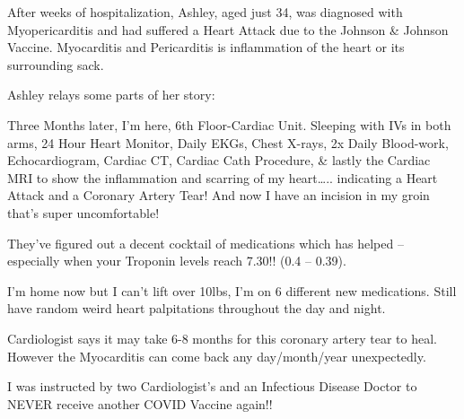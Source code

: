 After weeks of hospitalization, Ashley, aged just 34, was diagnosed with
Myopericarditis and had suffered a Heart Attack due to the Johnson \& Johnson
Vaccine. Myocarditis and Pericarditis is inflammation of the heart or its
surrounding sack.

Ashley relays some parts of her story:

Three Months later, I’m here, 6th Floor-Cardiac Unit. Sleeping with IVs in both
arms, 24 Hour Heart Monitor, Daily EKGs, Chest X-rays, 2x Daily Blood-work,
Echocardiogram, Cardiac CT, Cardiac Cath Procedure, \& lastly the Cardiac MRI to
show the inflammation and scarring of my heart….. indicating a Heart Attack and
a Coronary Artery Tear! And now I have an incision in my groin that’s super
uncomfortable!

They’ve figured out a decent cocktail of medications which has helped –
especially when your Troponin levels reach 7.30!! (0.4 – 0.39).

I’m home now but I can’t lift over 10lbs, I’m on 6 different new
medications. Still have random weird heart palpitations throughout the day and
night.

Cardiologist says it may take 6-8 months for this coronary artery tear to
heal. However the Myocarditis can come back any day/month/year unexpectedly.

I was instructed by two Cardiologist’s and an Infectious Disease Doctor to NEVER
receive another COVID Vaccine again!!

